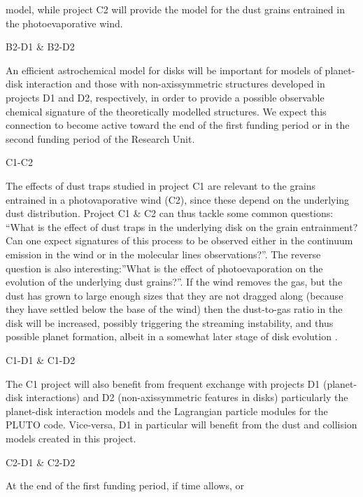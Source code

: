 \documentclass[10pt,fleqn,twoside,a4paper]{article}
\begin{document}
model, while project C2 will provide the model for the dust
grains entrained in the photoevaporative wind. \\
\begin{Emphasize} B2-D1 \& B2-D2  \end{Emphasize}
An efficient astrochemical model for disks will be important for models of planet-disk
interaction and those with non-axissymmetric structures developed in
projects D1 and D2, respectively, in order to provide a possible
observable chemical signature of the theoretically modelled
structures. We expect this connection to become active toward the end
of the first funding period or in the second funding period of the
Research Unit. \\
\begin{Emphasize}  C1-C2  \end{Emphasize} The effects of dust traps studied in
project C1 are relevant to the grains entrained in a photovaporative
wind (C2), since these depend on the underlying dust
distribution. Project C1 \& C2 can thus tackle some common questions: ``What is the effect of dust traps in the underlying disk
on the grain entrainment? Can one expect signatures of this process to
be observed either in the continuum emission in the wind or in the
molecular lines observations?''. The reverse question is also
interesting:''What is the effect of photoevaporation on the evolution
of the underlying dust grains?''.  If the wind removes the gas, but the dust has
  grown to large enough sizes that they are not dragged along (because they
  have settled below the base of the wind) then the dust-to-gas ratio in the
  disk will be increased, possibly triggering the streaming instability, and
  thus possible planet formation, albeit in a somewhat later stage of disk
  evolution \citep[e.g.][]{2005ApJ...623L.149T}.\\
\begin{Emphasize}  C1-D1 \& C1-D2  \end{Emphasize}
  The C1 project will also benefit from 
frequent exchange with projects D1 (planet-disk interactions) and D2
(non-axissymmetric features in disks)
particularly the planet-disk interaction models and the Lagrangian
particle modules for the PLUTO code. Vice-versa, D1 in particular will
benefit from the dust and collision models created in this
project. \\
\begin{Emphasize}  C2-D1 \& C2-D2 \end{Emphasize} At the end of the first funding period, if time allows, or
\end{document}
